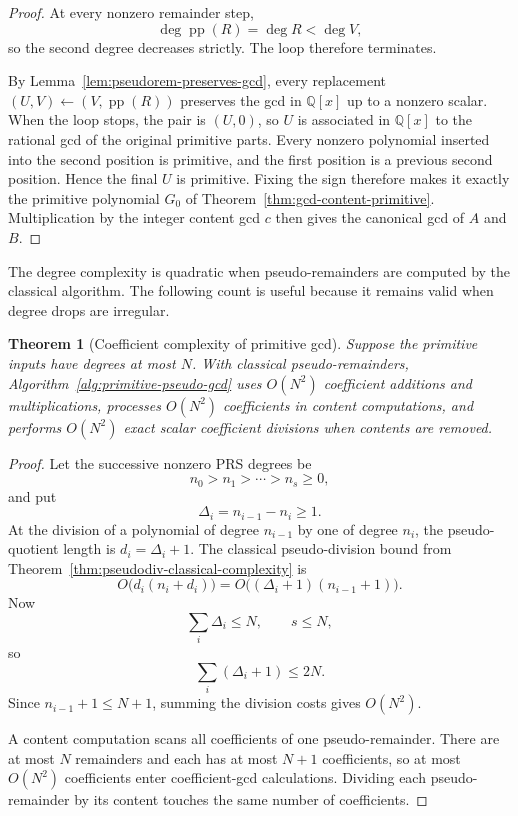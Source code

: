 \documentclass[11pt]{book}
\newtheorem{theorem}{Theorem}[section]
\theoremstyle{definition}
\begin{document}
\begin{proof}
At every nonzero remainder step,
\[
 \deg\operatorname{pp}(R)=\deg R<\deg V,
\]
so the second degree decreases strictly.  The loop therefore terminates.

By Lemma~\ref{lem:pseudorem-preserves-gcd}, every replacement
$(U,V)\leftarrow(V,\operatorname{pp}(R))$ preserves the gcd in $\mathbb Q[x]$
up to a nonzero scalar.  When the loop stops, the pair is $(U,0)$, so $U$ is
associated in $\mathbb Q[x]$ to the rational gcd of the original primitive
parts.  Every nonzero polynomial inserted into the second position is
primitive, and the first position is a previous second position.  Hence the
final $U$ is primitive.  Fixing the sign therefore makes it exactly the
primitive polynomial $G_0$ of
Theorem~\ref{thm:gcd-content-primitive}.  Multiplication by the integer content
gcd $c$ then gives the canonical gcd of $A$ and $B$.
\end{proof}

The degree complexity is quadratic when pseudo-remainders are computed by the
classical algorithm.  The following count is useful because it remains valid
when degree drops are irregular.

\begin{theorem}[Coefficient complexity of primitive gcd]
\label{thm:primitive-gcd-coefficient-complexity}
Suppose the primitive inputs have degrees at most $N$.  With classical
pseudo-remainders, Algorithm~\ref{alg:primitive-pseudo-gcd} uses
$O(N^2)$ coefficient additions and multiplications, processes $O(N^2)$
coefficients in content computations, and performs $O(N^2)$ exact scalar
coefficient divisions when contents are removed.
\end{theorem}

\begin{proof}
Let the successive nonzero PRS degrees be
\[
 n_0>n_1>\cdots>n_s\ge0,
\]
and put
\[
 \Delta_i=n_{i-1}-n_i\ge1.
\]
At the division of a polynomial of degree $n_{i-1}$ by one of degree $n_i$,
the pseudo-quotient length is $d_i=\Delta_i+1$.  The classical pseudo-division
bound from Theorem~\ref{thm:pseudodiv-classical-complexity} is
\[
 O\bigl(d_i(n_i+d_i)\bigr)
 =O\bigl((\Delta_i+1)(n_{i-1}+1)\bigr).
\]
Now
\[
 \sum_i\Delta_i\le N,
 \qquad
 s\le N,
\]
so
\[
 \sum_i(\Delta_i+1)\le2N.
\]
Since $n_{i-1}+1\le N+1$, summing the division costs gives $O(N^2)$.

A content computation scans all coefficients of one pseudo-remainder.  There
are at most $N$ remainders and each has at most $N+1$ coefficients, so at most
$O(N^2)$ coefficients enter coefficient-gcd calculations.  Dividing each
pseudo-remainder by its content touches the same number of coefficients.
\end{proof}
\end{document}
